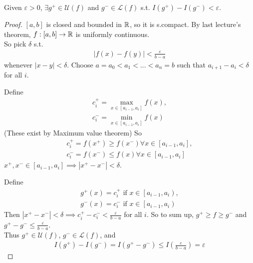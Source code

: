 \documentclass[a4paper]{article}
\begin{document}
\begin{lemma}
Given $\varepsilon>0$, $\exists g^+ \in \mathcal{U}\left(f\right)$ and $g^- \in \mathcal{L}\left(f\right)$ s.t. $I\left(g^+\right) - I\left(g^-\right) < \varepsilon$.
\begin{proof}
$\left[a,b\right]$ is closed and bounded in $\mathbb{R}$, so it is s.compact. By last lecture's theorem, $f: \left[a,b\right] \to \mathbb{R}$ is uniformly continuous.\\
So pick $\delta$ s.t.
\begin{equation*}
\begin{aligned}
|f\left(x\right) - f\left(y\right) | < \frac{\varepsilon}{b-a}
\end{aligned}
\end{equation*}
whenever $|x-y| < \delta$. Choose $a=a_0<a_1<...<a_n = b$ such that $a_{i+1}-a_i < \delta$ for all $i$.

Define
\begin{equation*}
\begin{aligned}
c_i^+ = \max_{x\in\left[a_{i-1},a_i\right]} f\left(x\right),\\
c_i^- = \min_{x\in\left[a_{i-1},a_i\right]} f\left(x\right)
\end{aligned}
\end{equation*}
(These exist by Maximum value theorem) So 
\begin{equation*}
\begin{aligned}
c_i^+ = f\left(x^+\right) \geq f\left(x^-\right) \forall x \in \left[a_{i-1},a_i\right],\\
c_i^- = f\left(x^-\right) \leq f\left(x\right) \forall x\in\left[a_{i-1},a_i\right]
\end{aligned}
\end{equation*}
$x^+,x^- \in \left[a_{i-1},a_i\right] \implies |x^+ - x^-| < \delta$.

Define 
\begin{equation*}
\begin{aligned}
g^+\left(x\right) = c_i^+ \text{ if } x \in \left[a_{i-1},a_i\right),\\
g^-\left(x\right) = c_i^- \text{ if } x \in \left[a_{i-1},a_i\right)
\end{aligned}
\end{equation*}
Then $|x^+ - x^-| < \delta \implies c_i^+ - c_i^- < \frac{\varepsilon}{b-a}$ for all $i$. So to sum up, $g^+ \geq f \geq g^-$ and $g^+ - g^- \leq \frac{\varepsilon}{b-a}$.\\
Thus $g^+ \in \mathcal{U}\left(f\right)$, $g^- \in \mathcal{L}\left(f\right)$, and 
\begin{equation*}
\begin{aligned}
I\left(g^+\right) - I\left(g^-\right) = I\left(g^+-g^-\right) \leq I\left(\frac{\varepsilon}{b-a}\right) = \varepsilon
\end{aligned}
\end{equation*}
\end{proof}
\end{lemma}
\end{document}
